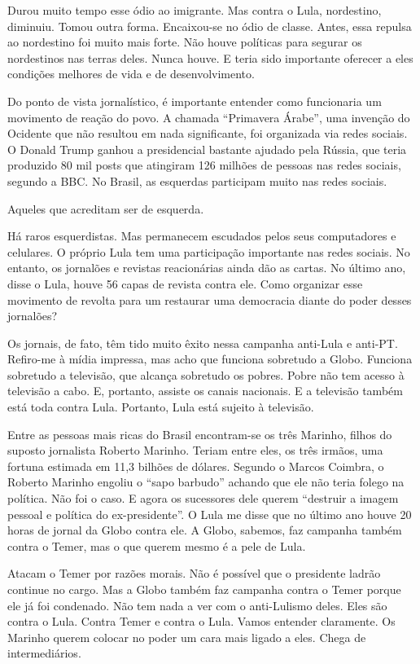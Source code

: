 \falaM Durou muito tempo esse ódio ao imigrante. Mas contra o Lula,
nordestino, diminuiu. Tomou outra forma. Encaixou-se no ódio de classe.
Antes, essa repulsa ao nordestino foi muito mais forte. Não houve
políticas para segurar os nordestinos nas terras deles. Nunca houve. E
teria sido importante oferecer a eles condições melhores de vida e de
desenvolvimento.

\falaG Do ponto de vista jornalístico, é importante entender como
funcionaria um movimento de reação do povo. A chamada ``Primavera
Árabe'', uma invenção do Ocidente que não resultou em nada significante,
foi organizada via redes sociais. O Donald Trump ganhou a presidencial
bastante ajudado pela Rússia, que teria produzido 80 mil posts que
atingiram 126 milhões de pessoas nas redes sociais, segundo a BBC. No
Brasil, as esquerdas participam muito nas redes sociais.

\falaM Aqueles que acreditam ser de esquerda.

\falaG Há raros esquerdistas. Mas permanecem escudados pelos seus
computadores e celulares. O próprio Lula tem uma participação importante
nas redes sociais. No entanto, os jornalões e revistas reacionárias
ainda dão as cartas. No último ano, disse o Lula, houve 56 capas de
revista contra ele. Como organizar esse movimento de revolta para um
restaurar uma democracia diante do poder desses jornalões?

\falaM Os jornais, de fato, têm tido muito êxito nessa campanha anti-Lula e
anti-PT. Refiro-me à mídia impressa, mas acho que funciona sobretudo a
Globo. Funciona sobretudo a televisão, que alcança sobretudo os pobres.
Pobre não tem acesso à televisão a cabo. E, portanto, assiste os canais
nacionais. E a televisão também está toda contra Lula. Portanto, Lula
está sujeito à televisão.

\falaG Entre as pessoas mais ricas do Brasil encontram-se os três Marinho,
filhos do suposto jornalista Roberto Marinho. Teriam entre eles, os três
irmãos, uma fortuna estimada em 11,3 bilhões de dólares. Segundo o
Marcos Coimbra, o Roberto Marinho engoliu o ``sapo barbudo'' achando que
ele não teria folego na política. Não foi o caso. E agora os sucessores
dele querem ``destruir a imagem pessoal e política do ex-presidente''. O
Lula me disse que no último ano houve 20 horas de jornal da Globo contra
ele. A Globo, sabemos, faz campanha também contra o Temer, mas o que
querem mesmo é a pele de Lula.

\falaM Atacam o Temer por razões morais. Não é possível que o presidente
ladrão continue no cargo. Mas a Globo também faz campanha contra o Temer
porque ele já foi condenado. Não tem nada a ver com o anti-Lulismo
deles. Eles são contra o Lula. Contra Temer e contra o Lula. Vamos
entender claramente. Os Marinho querem colocar no poder um cara mais
ligado a eles. Chega de intermediários.

